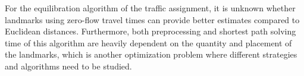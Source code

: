 For the equilibration algorithm of the traffic assignment,
it is unknown whether landmarks using zero-flow travel times can provide better estimates compared to Euclidean distances.
Furthermore, both preprocessing and shortest path solving time of this algorithm are heavily dependent on the quantity and placement of the landmarks,
which is another optimization problem where different strategies and algorithms need to be studied.

